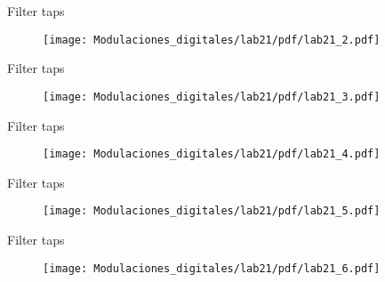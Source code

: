 
\begin{frame}{Filter taps}
\begin{figure}[H]
\centering
\vspace{-3mm}
\texttt{[image: Modulaciones\_digitales/lab21/pdf/lab21\_2.pdf]}
\end{figure}
\end{frame}


\begin{frame}{Filter taps}
\begin{figure}[H]
\centering
\vspace{-3mm}
\texttt{[image: Modulaciones\_digitales/lab21/pdf/lab21\_3.pdf]}
\end{figure}
\end{frame}

\begin{frame}{Filter taps}
\begin{figure}[H]
\centering
\vspace{-3mm}
\texttt{[image: Modulaciones\_digitales/lab21/pdf/lab21\_4.pdf]}
\end{figure}
\end{frame}


\begin{frame}{Filter taps}
\begin{figure}[H]
\centering
\vspace{-3mm}
\texttt{[image: Modulaciones\_digitales/lab21/pdf/lab21\_5.pdf]}
\end{figure}
\end{frame}


\begin{frame}{Filter taps}
\begin{figure}[H]
\centering
\vspace{-3mm}
\texttt{[image: Modulaciones\_digitales/lab21/pdf/lab21\_6.pdf]}
\end{figure}
\end{frame}

